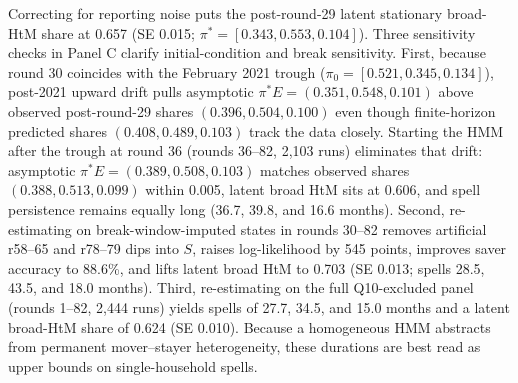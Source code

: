 \documentclass[11pt]{article}
\begin{document}
Correcting for reporting noise puts the post-round-29 latent stationary broad-HtM share at 0.657 (SE 0.015; $\pi^* = [0.343, 0.553, 0.104]$). Three sensitivity checks in Panel C clarify initial-condition and break sensitivity. First, because round 30 coincides with the February 2021 trough ($\pi_0 = [0.521, 0.345, 0.134]$), post-2021 upward drift pulls asymptotic $\pi^* E = (0.351, 0.548, 0.101)$ above observed post-round-29 shares $(0.396, 0.504, 0.100)$ even though finite-horizon predicted shares $(0.408, 0.489, 0.103)$ track the data closely. Starting the HMM after the trough at round 36 (rounds 36--82, 2,103 runs) eliminates that drift: asymptotic $\pi^* E = (0.389, 0.508, 0.103)$ matches observed shares $(0.388, 0.513, 0.099)$ within 0.005, latent broad HtM sits at 0.606, and spell persistence remains equally long (36.7, 39.8, and 16.6 months). Second, re-estimating on break-window-imputed states in rounds 30--82 removes artificial r58--65 and r78--79 dips into $S$, raises log-likelihood by 545 points, improves saver accuracy to 88.6\%, and lifts latent broad HtM to 0.703 (SE 0.013; spells 28.5, 43.5, and 18.0 months). Third, re-estimating on the full Q10-excluded panel (rounds 1--82, 2,444 runs) yields spells of 27.7, 34.5, and 15.0 months and a latent broad-HtM share of 0.624 (SE 0.010). Because a homogeneous HMM abstracts from permanent mover--stayer heterogeneity, these durations are best read as upper bounds on single-household spells.
\end{document}
